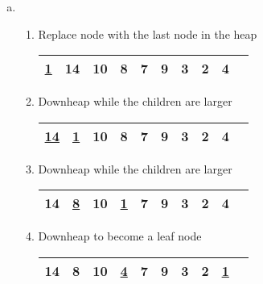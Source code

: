 \documentclass[fleqn, 12pt]{article}
\begin{document}
\begin{enumerate}[a)]
\item
    \begin{enumerate}[Step 1:]
    \item Replace node with the last node in the heap
        \begin{center}
            \begin{tabular}{|*{10}{c|}}
                \hline
                \underline{1} & 14 & 10 & 8 & 7 & 9 & 3 & 2 & 4\\
                \hline
            \end{tabular}
        \end{center}
        

    \item Downheap while the children are larger
        \begin{center}
            \begin{tabular}{|*{10}{c|}}
                \hline
                \underline{14} & \underline{1} & 10 & 8 & 7 & 9 & 3 & 2 & 4\\
                \hline
            \end{tabular}
        \end{center}
        \newpage
        
    \item Downheap while the children are larger
        \begin{center}
            \begin{tabular}{|*{10}{c|}}
                \hline
                14 & \underline{8} & 10 & \underline{1} & 7 & 9 & 3 & 2 & 4\\
                \hline
            \end{tabular}
        \end{center}
    
    \item Downheap to become a leaf node
        \begin{center}
            \begin{tabular}{|*{10}{c|}}
                \hline
                14 & 8 & 10 & \underline{4} & 7 & 9 & 3 & 2 & \underline{1}\\
                \hline
            \end{tabular}
        \end{center}
    \end{enumerate}


\end{enumerate}
\end{document}
